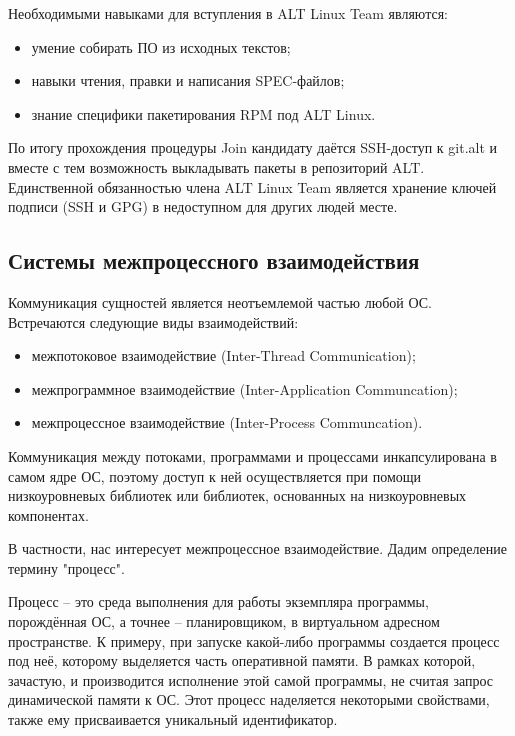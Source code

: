 \documentclass[bachelor, och, pract]{SCWorks}
\begin{document}
Необходимыми навыками для вступления в ALT Linux Team являются:
\begin{itemize}
    \item умение собирать ПО из исходных текстов;
    \item навыки чтения, правки и написания SPEC-файлов;
    \item знание специфики пакетирования RPM под ALT Linux.
\end{itemize}

По итогу прохождения процедуры Join кандидату даётся SSH-доступ к git.alt и вместе с тем возможность выкладывать пакеты в репозиторий ALT.
Единственной обязанностью члена ALT Linux Team является хранение ключей подписи (SSH и GPG) в недоступном для других людей месте\cite{a_join}.

\subsection{Системы межпроцессного взаимодействия}

Коммуникация сущностей является неотъемлемой частью любой ОС.
Встречаются следующие виды взаимодействий:

\begin{itemize}
    \item межпотоковое взаимодействие (Inter-Thread Communication);
    \item межпрограммное взаимодействие (Inter-Application Communcation);
    \item межпроцессное взаимодействие (Inter-Process Communcation).
\end{itemize}

Коммуникация между потоками, программами и процессами инкапсулирована в самом ядре ОС, поэтому доступ к ней осуществляется при помощи низкоуровневых библиотек или библиотек, основанных на низкоуровневых компонентах.

В частности, нас интересует межпроцессное взаимодействие. Дадим определение термину "процесс".

Процесс -- это среда выполнения для работы экземпляра программы, порождённая ОС, а точнее -- планировщиком, в виртуальном адресном пространстве.
К примеру, при запуске какой-либо программы создается процесс под неё, которому выделяется часть оперативной памяти.
В рамках которой, зачастую, и производится исполнение этой самой программы, не считая запрос динамической памяти к ОС.
Этот процесс наделяется некоторыми свойствами, также ему присваивается уникальный идентификатор.
\end{document}
